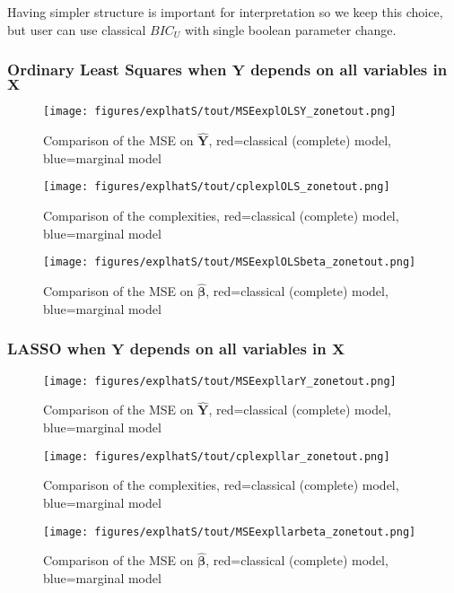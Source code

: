 \documentclass[12pt,a4paper]{report}
\begin{document}
 Having simpler structure is important for interpretation so we keep this choice, but user can use classical $BIC_U$ with single boolean parameter change.

 
\FloatBarrier

\newpage
\subsubsection{Ordinary Least Squares when $\boldsymbol{Y}$ depends on all variables in $\boldsymbol{X}$}

	\begin{figure}[h!]
	\centering
		  \texttt{[image: figures/explhatS/tout/MSEexplOLSY\_zonetout.png]}
		\caption{Comparison of the MSE on $\hat{\boldsymbol{Y}}$, red=classical (complete) model, blue=marginal model}\label{MSEexplOLSY_zonetout}
	\end{figure}
	\begin{figure}[h!]
	\centering
		  \texttt{[image: figures/explhatS/tout/cplexplOLS\_zonetout.png]}
		\caption{Comparison of the complexities, red=classical (complete) model, blue=marginal model}\label{cplexplOLS_zonetout}
	\end{figure}
	\begin{figure}[h!]
	\centering
		  \texttt{[image: figures/explhatS/tout/MSEexplOLSbeta\_zonetout.png]}
		\caption{Comparison of the MSE on $\hat{\boldsymbol{\beta}}$, red=classical (complete) model, blue=marginal model}\label{MSEexplOLSbeta_zonetout}
	\end{figure}
	\FloatBarrier
\newpage
\subsubsection{LASSO when $\boldsymbol{Y}$ depends on all variables in $\boldsymbol{X}$}

	\begin{figure}[h!]
	\centering
		  \texttt{[image: figures/explhatS/tout/MSEexpllarY\_zonetout.png]}
		\caption{Comparison of the MSE on $\hat{\boldsymbol{Y}}$, red=classical (complete) model, blue=marginal model}\label{MSEexpllarY_zonetout}
	\end{figure}
	\begin{figure}[h!]
	\centering
		  \texttt{[image: figures/explhatS/tout/cplexpllar\_zonetout.png]}
		\caption{Comparison of the complexities, red=classical (complete) model, blue=marginal model}\label{cplexpllar_zonetout}
	\end{figure}
	\begin{figure}[h!]
	\centering
		  \texttt{[image: figures/explhatS/tout/MSEexpllarbeta\_zonetout.png]}
		\caption{Comparison of the MSE on $\hat{\boldsymbol{\beta}}$, red=classical (complete) model, blue=marginal model}\label{MSEexpllarbeta_zonetout}
	\end{figure}
	\FloatBarrier
\newpage
\end{document}
